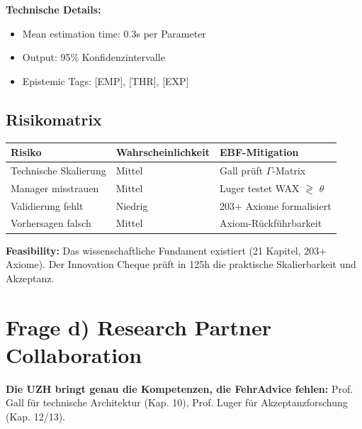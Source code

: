 \documentclass[11pt,a4paper]{article}
\begin{document}
\textbf{Technische Details:}
\begin{itemize}[nosep]
    \item Mean estimation time: 0.3s per Parameter
    \item Output: 95\% Konfidenzintervalle
    \item Epistemic Tags: [EMP], [THR], [EXP]
\end{itemize}

\subsection{Risikomatrix}

\begin{center}
\begin{tabular}{lll}
\toprule
\textbf{Risiko} & \textbf{Wahrscheinlichkeit} & \textbf{EBF-Mitigation} \\
\midrule
Technische Skalierung & Mittel & Gall prüft $\Gamma$-Matrix \\
Manager misstrauen & Mittel & Luger testet WAX $\gtrless$ $\theta$ \\
Validierung fehlt & Niedrig & 203+ Axiome formalisiert \\
Vorhersagen falsch & Mittel & Axiom-Rückführbarkeit \\
\bottomrule
\end{tabular}
\end{center}

\begin{summarybox}
\textbf{Feasibility:} Das wissenschaftliche Fundament existiert (21 Kapitel, 203+ Axiome). Der Innovation Cheque prüft in 125h die praktische Skalierbarkeit und Akzeptanz.
\end{summarybox}

\newpage


\section{Frage d) Research Partner Collaboration}

\begin{keyinsight}
\textbf{Die UZH bringt genau die Kompetenzen, die FehrAdvice fehlen:} Prof. Gall für technische Architektur (Kap. 10), Prof. Luger für Akzeptanzforschung (Kap. 12/13).
\end{keyinsight}
\end{document}
